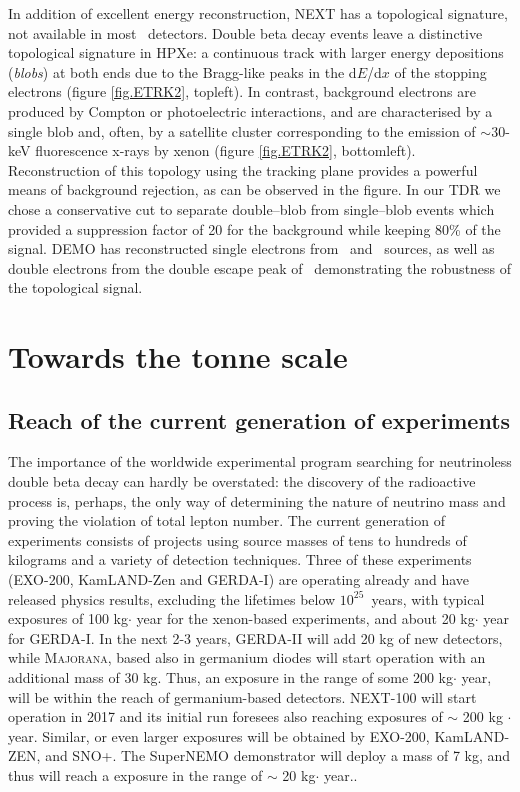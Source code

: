 \documentclass{PoS}
\begin{document}
In addition of excellent energy reconstruction, NEXT has a topological signature, not available in most \bbonu\ detectors. 
Double beta decay events leave a distinctive topological signature in HPXe: a continuous track with larger energy depositions (\emph{blobs}) at both ends due to the Bragg-like peaks in the d$E$/d$x$ of the stopping electrons (figure \ref{fig.ETRK2}, topleft). In contrast, background electrons are produced by Compton or photoelectric interactions, and are characterised by a single blob and, often, by a satellite cluster corresponding to the emission of $\sim30$-keV fluorescence x-rays by xenon (figure \ref{fig.ETRK2}, bottomleft).
Reconstruction of this topology using the tracking plane provides a powerful means of background rejection, as can be observed in the figure. In our TDR we chose a conservative cut to separate double--blob from single--blob events which provided a suppression factor of 20 for the background while keeping 80\% of the signal.  DEMO has reconstructed single electrons from \NA\ and \CS\ sources, as well as double electrons from the double escape peak of \TL\, demonstrating the robustness of the topological signal. 


\section{Towards the tonne scale} \label{tonne}


\subsection{Reach of the current generation of experiments}
The importance of the worldwide experimental program searching for neutrinoless double beta decay can hardly be overstated: the discovery of the radioactive process is, perhaps, the only way of determining the nature of neutrino mass and proving the violation of total lepton number. The current generation of experiments consists of projects using source masses of tens to hundreds of kilograms and a variety of detection techniques.  Three of these experiments (EXO-200, KamLAND-Zen and GERDA-I) are operating already and have released physics results, excluding the lifetimes below $10^{25}$~years, with typical exposures of 100 kg$\cdot$ year for the xenon-based experiments, and about  20 kg$\cdot$ year for GERDA-I. In the next 2-3 years, GERDA-II will add 20 kg of new detectors, while {\scshape Majorana}, based also in germanium diodes will start operation with an additional mass of 30 kg. Thus, an exposure in the range of some 200 kg$\cdot$ year, will be within the reach of germanium-based detectors.  NEXT-100  will start operation in 2017 and its initial run foresees also reaching exposures 
of $\sim$ 200 kg $\cdot$ year. Similar, or even larger exposures will be obtained by EXO-200, KamLAND-ZEN, and SNO+. The SuperNEMO demonstrator will deploy a mass of 7 kg, and thus will reach a exposure in the range of $\sim$  20 kg$\cdot$ year.. 
\end{document}
